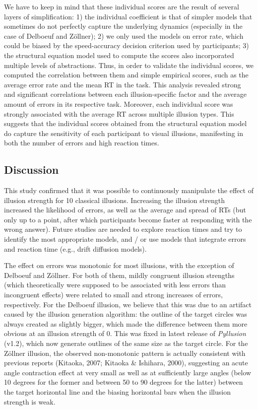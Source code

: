 \documentclass[
  man,floatsintext]{apa6}
\begin{document}
We have to keep in mind that these individual scores are the result of several layers of simplification: 1) the individual coefficient is that of simpler models that sometimes do not perfectly capture the underlying dynamics (especially in the case of Delboeuf and Zöllner); 2) we only used the models on error rate, which could be biased by the speed-accuracy decision criterion used by participants; 3) the structural equation model used to compute the scores also incorporated multiple levels of abstractions. Thus, in order to validate the individual scores, we computed the correlation between them and simple empirical scores, such as the average error rate and the mean RT in the task. This analysis revealed strong and significant correlations between each illusion-specific factor and the average amount of errors in its respective task. Moreover, each individual score was strongly associated with the average RT across multiple illusion types. This suggests that the individual scores obtained from the structural equation model do capture the sensitivity of each participant to visual illusions, manifesting in both the number of errors and high reaction times.

\hypertarget{discussion-1}{%
\subsection{Discussion}\label{discussion-1}}

This study confirmed that it was possible to continuously manipulate the effect of illusion strength for 10 classical illusions. Increasing the illusion strength increased the likelihood of errors, as well as the average and spread of RTs (but only up to a point, after which participants become faster at responding with the wrong answer). Future studies are needed to explore reaction times and try to identify the most appropriate models, and / or use models that integrate errors and reaction time (e.g., drift diffusion models).

The effect on errors was monotonic for most illusions, with the exception of Delboeuf and Zöllner. For both of them, mildly congruent illusion strengths (which theoretically were supposed to be associated with less errors than incongruent effects) were related to small and strong increases of errors, respectively. For the Delboeuf illusion, we believe that this was due to an artifact caused by the illusion generation algorithm: the outline of the target circles was always created as slightly bigger, which made the difference between them more obvious at an illusion strength of 0. This was fixed in latest release of \emph{Pyllusion} (v1.2), which now generate outlines of the same size as the target circle. For the Zöllner illusion, the observed non-monotonic pattern is actually consistent with previous reports (Kitaoka, 2007; Kitaoka \& Ishihara, 2000), suggesting an acute angle contraction effect at very small as well as at sufficiently large angles (below 10 degrees for the former and between 50 to 90 degrees for the latter) between the target horizontal line and the biasing horizontal bars when the illusion strength is weak.
\end{document}
